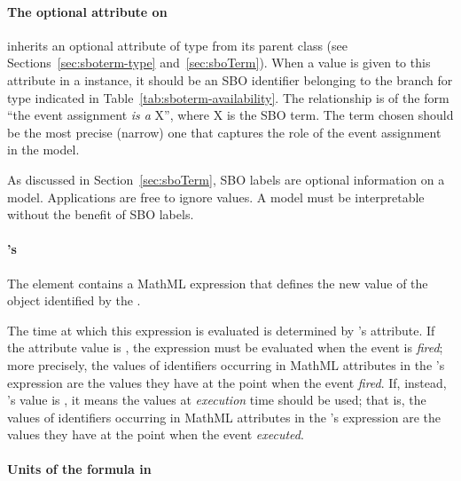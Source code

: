 \paragraph{The optional  attribute on }
\label{sec:eventassignment-sboterm}

\EventAssignment   inherits an optional 
attribute of type  from its parent
class \SBase (see Sections~\ref{sec:sboterm-type}
and~\ref{sec:sboTerm}).  When a value is given to this
attribute in a  \EventAssignment  instance, it should be an
SBO identifier belonging to the branch for type  \EventAssignment 
indicated in Table~\ref{tab:sboterm-availability}.  The relationship is
of the form ``the event assignment \emph{is a} X'', where X is
the SBO term.  The term chosen should be the most precise (narrow)
one that captures the role of the event assignment  in the model.

As discussed in Section~\ref{sec:sboTerm}, SBO labels are optional
information on a model.  Applications are free to ignore
 values.  A model must be interpretable without the
benefit of SBO labels.


\paragraph{'s }

The  element contains a MathML expression that defines
the new value of the object identified by the .

The time at which this expression is evaluated is determined by
\Event's  attribute.  If the
attribute value is , the expression must
be evaluated when the event is \emph{fired}; more precisely, the
values of identifiers occurring in MathML  attributes in
the \EventAssignment's  expression are the values they
have at the point when the event \emph{fired}.  If, instead,
's value is , it means
the values at \emph{execution} time should be used; that is, the
values of identifiers occurring in MathML  attributes in
the \EventAssignment's  expression are the values they
have at the point when the event \emph{executed}.


\paragraph{Units of the  formula in }

